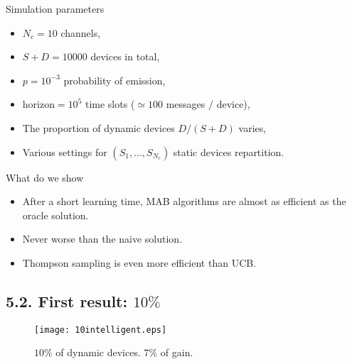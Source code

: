 \begin{frameO}

    \begin{colorblock}{Simulation parameters}

        \begin{itemize}
            \tightlist
            \item
                  \(N_c = 10\) channels,
            \item
                  \(S + D = 10000\) devices in total,
            \item
                  \(p = 10^{-3}\) probability of emission,
            \item
                  \(\text{horizon} = 10^5\) time slots (\(\simeq 100\) messages \(/\)
                  device),
            \item
                  The proportion of dynamic devices \(D/(S+D)\) varies,
            \item
                  Various settings for \((S_1,\dots,S_{N_c})\) static devices
                  repartition.
        \end{itemize}

    \end{colorblock}

    \begin{colorblock}{What do we show}

        \begin{itemize}
            \tightlist
            \item
                  After a short learning time, MAB algorithms are almost as efficient as
                  the oracle solution.
            \item
                  Never worse than the naive solution.
            \item
                  Thompson sampling is even more efficient than UCB.
        \end{itemize}

    \end{colorblock}

\end{frameO}



\subsection{\hfill{}5.2. First result: $10\%$\hfill{}}

\begin{frameO}

    \begin{figure}[h!]
        \centering
        \texttt{[image: 10intelligent.eps]}
        \caption{\small{$10\%$ of dynamic devices. $7\%$ of gain.}}
    \end{figure}

\end{frameO}



